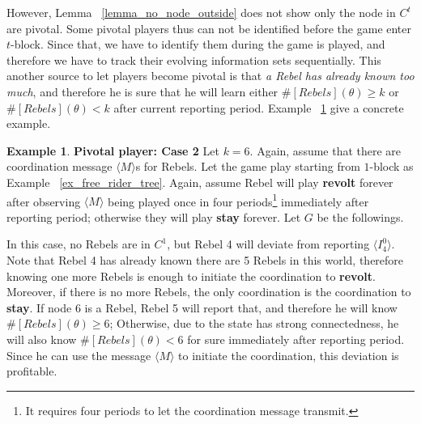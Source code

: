 \documentclass[12pt,letter]{article}
\theoremstyle{definition}
\newtheorem{example}{Example}[section]
\theoremstyle{remark}
\theoremstyle{claim}
\begin{document}
However, Lemma ~\ref{lemma_no_node_outside} does not show only the node in $C^t$ are pivotal. Some pivotal players thus can not be identified before the game enter $t$-block. Since that, we have to identify them during the game is played, and therefore we have to track their evolving information sets sequentially. This another source to let players become pivotal is that \textit{a Rebel has already known too much}, and therefore he is sure that he will learn {either $\#[Rebels](\theta)\geq k$ or $\#[Rebels](\theta)< k$} after current reporting period. Example ~\ref{ex_pivotal_2} give a concrete example.

\begin{example} \label{ex_pivotal_2}\textbf{Pivotal player: Case 2}
Let $k=6$. Again, assume that there are coordination message $\langle M\rangle$s for Rebels. Let the game play starting from $1$-block as Example ~\ref{ex_free_rider_tree}. Again, assume Rebel will play \textbf{revolt} forever after observing $\langle M \rangle$ being played once in four periods\footnote{It requires four periods to let the coordination message transmit.} immediately after reporting period; otherwise they will play \textbf{stay} forever. Let $G$ be the followings.

\begin{center}
\end{center}

In this case, no Rebels are in $C^1$, but Rebel 4 will deviate from reporting $\langle I^0_4 \rangle$. Note that Rebel 4 has already known there are 5 Rebels in this world, therefore knowing one more Rebels is enough to initiate the coordination to \textbf{revolt}. Moreover, if there is no more Rebels, the only coordination is the coordination to \textbf{stay}. If node 6 is a Rebel, Rebel 5 will report that, and therefore he will know $\#[Rebels](\theta)\geq 6$; Otherwise, due to the state has strong connectedness, he will also know $\#[Rebels](\theta)< 6$ for sure immediately after reporting period. Since he can use the message $\langle M \rangle$ to initiate the coordination, this deviation is profitable.
\end{example}
\end{document}
